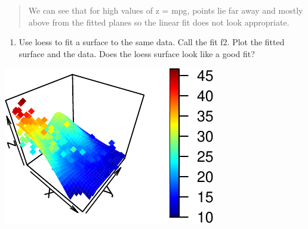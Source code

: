 \documentclass[]{article}
\newenvironment{Shaded}{\begin{snugshade}}{\end{snugshade}}
\newcommand{\DataTypeTok}[1]{\textcolor[rgb]{0.13,0.29,0.53}{#1}}
\newcommand{\DecValTok}[1]{\textcolor[rgb]{0.00,0.00,0.81}{#1}}
\newcommand{\KeywordTok}[1]{\textcolor[rgb]{0.13,0.29,0.53}{\textbf{#1}}}
\newcommand{\NormalTok}[1]{#1}
\newcommand{\OperatorTok}[1]{\textcolor[rgb]{0.81,0.36,0.00}{\textbf{#1}}}
\newcommand{\StringTok}[1]{\textcolor[rgb]{0.31,0.60,0.02}{#1}}
\providecommand{\tightlist}{%
  \setlength{\itemsep}{0pt}\setlength{\parskip}{0pt}}
\begin{document}
\begin{quote}
We can see that for high values of z = mpg, points lie far away and
mostly above from the fitted planes so the linear fit does not look
appropriate.
\end{quote}

\begin{enumerate}
\def\labelenumi{(\alph{enumi})}
\setcounter{enumi}{4}
\tightlist
\item
  Use loess to fit a surface to the same data. Call the fit f2. Plot the
  fitted surface and the data. Does the loess surface look like a good
  fit?
\end{enumerate}

\begin{Shaded}
\end{Shaded}

\begin{center}\includegraphics{sol_A2_files/figure-latex/unnamed-chunk-21-1} \end{center}
\end{document}
